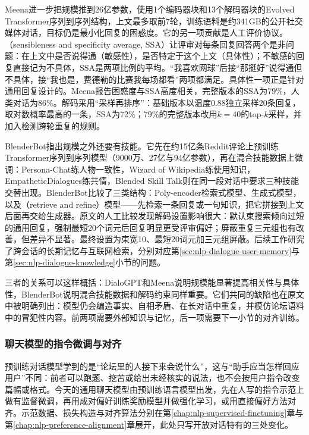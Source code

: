 Meena进一步把规模推到26亿参数，使用1个编码器块和13个解码器块的Evolved Transformer序列到序列结构，上文最多取前7轮，训练语料是约341GB的公开社交媒体对话，目标仍是最小化回复的困惑度。它的另一项贡献是人工评价协议。（sensibleness and specificity average, SSA）让评审对每条回复回答两个是非问题：在上文中是否说得通（敏感性），是否特定于这个上文（具体性）；不敏感的回复直接记为不具体，SSA是两项比例的平均。“我喜欢网球”后接“那挺好”说得通但不具体，接“我也是，费德勒的比赛我每场都看”两项都满足。具体性一项正是针对通用回复设计的。Meena报告困惑度与SSA高度相关，完整版本的SSA为79\%，人类对话为86\%。解码采用“采样再排序”：基础版本以温度0.88独立采样20条回复，取对数概率最高的一条，SSA为72\%；79\%的完整版本改用$k=40$的top-$k$采样，并加入检测跨轮重复的规则。

BlenderBot指出规模之外还要有技能。它先在约15亿条Reddit评论上预训练Transformer序列到序列模型（9000万、27亿与94亿参数），再在混合技能数据上微调：Persona-Chat练人物一致性，Wizard of Wikipedia练使用知识，EmpatheticDialogues练共情\cite{nlp-intro-zhang2018persona,nlp-intro-dinan2019,nlp-dialogue-rashkin2019empathetic}，Blended Skill Talk则在同一段对话中要求三种技能交替出现。BlenderBot比较了三类结构：Poly-encoder检索式模型、生成式模型，以及（retrieve and refine）模型——先检索一条回复或一句知识，把它拼接到上文后面再交给生成器。原文的人工比较发现解码设置影响很大：默认束搜索倾向过短的通用回复，强制最短20个词元后回复明显更受评审偏好；屏蔽重复三元组也有改善，但差异不显著。最终设置为束宽10、最短20词元加三元组屏蔽。后续工作研究了跨会话的长期记忆与互联网检索，分别对应第\ref{sec:nlp-dialogue-user-memory}与第\ref{sec:nlp-dialogue-knowledge}小节的问题\cite{nlp-dialogue-xu2022goldfish,nlp-dialogue-komeili2022internet}。

三者的关系可以这样概括：DialoGPT和Meena说明规模能显著提高相关性与具体性，BlenderBot说明混合技能数据和解码约束同样重要。它们共同的缺陷也在原文中被明确列出：模型仍会编造事实、自相矛盾、在长对话中重复，并模仿论坛语料中的冒犯性内容。前两项需要外部知识与记忆，后一项需要下一小节的对齐训练。

\subsubsection{聊天模型的指令微调与对齐}
\label{sec:nlp-dialogue-chat-alignment}

预训练对话模型学到的是“论坛里的人接下来会说什么”，这与“助手应当怎样回应用户”不同：前者可以跑题、挖苦或给出未经核实的说法，也不会按用户指令改变篇幅或格式。今天的通用聊天模型由预训练语言模型出发，先在人写的指令示范上做有监督微调，再用成对偏好训练奖励模型并做强化学习，或用直接偏好方法对齐。示范数据、损失构造与对齐算法分别在第\ref{chap:nlp-supervised-finetuning}章与第\ref{chap:nlp-preference-alignment}章展开，此处只写开放对话特有的三处变化。

